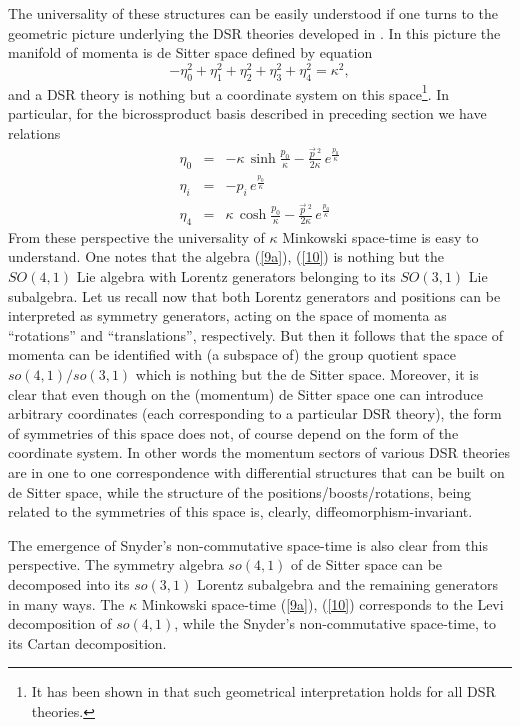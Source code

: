 \documentclass[a4paper,a4paper]{article}
\begin{document}
The universality of these structures can be easily understood if one turns to the geometric picture underlying the DSR theories developed in \cite{Kowalski-Glikman:2002ft}. In this picture the manifold of momenta is de Sitter space defined by equation
\begin{equation}\label{13}
 -\eta_0^2 + \eta_1^2+ \eta_2^2+ \eta_3^2+ \eta_4^2 =\kappa^2,
\end{equation}
and a DSR theory is nothing but a coordinate system on this space\footnote{It has been shown in \cite{Kowalski-Glikman:2002jr} that such geometrical interpretation holds for all DSR theories.}. In particular, for the bicrossproduct basis described in preceding section we have relations
\begin{eqnarray}
{\eta_0} &=& -\kappa\, \sinh \frac{p_0}\kappa - \frac{\vec{p}\,{}^2}{2\kappa}\,
e^{  \frac{p_0}\kappa} \nonumber\\
\eta_i &=&  - p_i \, e^{  \frac{p_0}\kappa} \nonumber\\
{\eta_4} &=&  \kappa\, \cosh \frac{p_0}\kappa  - \frac{\vec{p}\,{}^2}{2\kappa} \,
e^{  \frac{p_0}\kappa}   \label{14}
\end{eqnarray}
From these perspective the universality of $\kappa$ Minkowski space-time is easy to understand. One notes that the algebra (\ref{9a}), (\ref{10})  is nothing but the $SO(4,1)$ Lie algebra with Lorentz
generators belonging to its $SO(3,1)$ Lie subalgebra.  Let us recall now that both Lorentz
generators and positions can be interpreted as symmetry
generators, acting on the space of momenta as ``rotations'' and
``translations'', respectively. But then it follows that the space
of momenta can be identified with (a subspace of) the group
quotient space $so(4,1)/so(3,1)$ which is nothing but the de
Sitter space. Moreover, it is clear that
 even though  on the (momentum) de Sitter space one can introduce arbitrary
 coordinates (each corresponding to a particular DSR theory), the form of symmetries
 of this space does not, of course depend on the form of the coordinate system. In other words the momentum sectors of various DSR
 theories are in one to one correspondence with differential structures that can be built on de Sitter
 space, while the structure of the positions/boosts/rotations, being related to the symmetries of this
 space is, clearly, diffeomorphism-invariant.

The emergence of Snyder's non-commutative space-time is also clear from this perspective. The symmetry algebra $so(4,1)$ of de Sitter space can be decomposed into its $so(3,1)$ Lorentz subalgebra and the remaining generators in many ways. The $\kappa$ Minkowski space-time (\ref{9a}), (\ref{10}) corresponds to the Levi decomposition of $so(4,1)$, while the Snyder's non-commutative space-time, to its Cartan decomposition.
\end{document}
